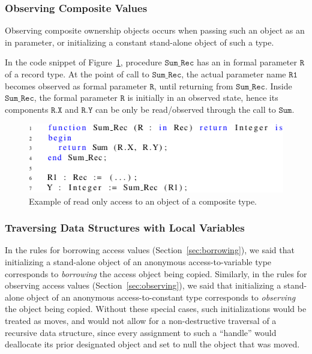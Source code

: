 \documentclass{llncs}
\newcommand\var[1]{\ensuremath{\mathtt{#1}}}
\newcommand{\keyword}[1]{\textsf{#1}}
\begin{document}
   
\subsubsection{Observing Composite Values}
\label{subsubsec:extendingBorrowing}

Observing composite ownership objects occurs when passing such an object as an \keyword{in} parameter, or initializing a constant stand-alone object of such a type. 

In the code snippet of Figure~\ref{fig:observingComposite}, procedure \var{Sum\_Rec} has an \keyword{in} formal parameter \var{R} of a record type.
At the point of call to \var{Sum\_Rec}, the actual parameter name \var{R1} becomes observed as formal parameter \var{R}, until returning from \var{Sum\_Rec}. Inside \var{Sum\_Rec},
the formal parameter \var{R} is initially in an observed state, hence its components \var{R.X} and \var{R.Y} can be only be read/observed through the call to \var{Sum}.


\begin{figure}[htb!]
\centering
  \captionsetup{justification=centering,margin=0.6cm}
   \includegraphics[]{observingComposite}
   \caption{Example of read only access to an object of a composite type.}
   \label{fig:observingComposite}
\end{figure}



\subsubsection{Traversing Data Structures with Local Variables}

In the rules for borrowing access values (Section~\ref{sec:borrowing}), we said that initializing a stand-alone object of an anonymous access-to-variable type corresponds to
\textit{borrowing} the access object being copied. Similarly, in the rules for observing access values (Section~\ref{sec:observing}), we said that initializing a stand-alone object of an
anonymous access-to-constant type corresponds to \textit{observing} the object being copied. Without these special cases, such initializations would be treated as moves, and would not allow for a non-destructive
traversal of a recursive data structure, since every assignment to such a ``handle'' would
deallocate its prior designated object and set to null the object that was moved.
\end{document}
